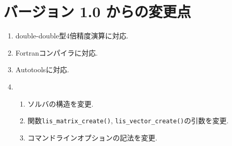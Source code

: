 \documentclass[a4paper]{jarticle}
\begin{document}
\section*{バージョン 1.0 からの変更点}
\begin{enumerate}
\item double-double型4倍精度演算に対応.
\item Fortranコンパイラに対応.
\item Autotoolsに対応.
\item 
\begin{enumerate}
\item ソルバの構造を変更.
\item 関数{\tt lis\_matrix\_create()}, {\tt lis\_vector\_create()}の引数を変更.
\item コマンドラインオプションの記法を変更.
\end{enumerate}
\end{enumerate}
\end{document}
